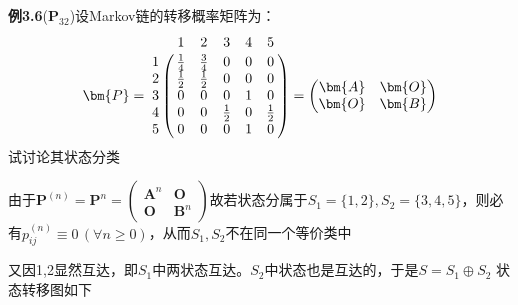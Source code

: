 \documentclass{elegantbook}
\begin{document}
\begin{example}
    \textbf{例3.6}($\mathbf{P}_{32}$)设Markov链的转移概率矩阵为：
    \[\bm{P}=\bordermatrix{
        & 1 & 2 & 3 & 4 & 5 \cr
      1 & \frac{1}{4} & \frac{3}{4} & 0 & 0 & 0 \cr
      2 & \frac{1}{2} & \frac{1}{2} & 0 & 0 & 0 \cr
      3 & 0 & 0 & 0 & 1 & 0 \cr
      4 & 0 & 0 & \frac{1}{2} & 0 & \frac{1}{2} \cr
      5 & 0 & 0 & 0 & 1 & 0}
    =\begin{pmatrix}
      \bm{A} & \bm{O} \\
      \bm{O} & \bm{B} \\
    \end{pmatrix}\]
    试讨论其状态分类
    \begin{solution}
        由于$\bm{P}^{(n)}=\bm{P}^n=\begin{pmatrix}  \bm{A}^n & \bm{O} \\  \bm{O} & \bm{B}^n\end{pmatrix}$故若状态分属于$S_1=\{1,2\},S_2=\{3,4,5\}$，则必有$p_{ij}^{(n)}\equiv 0\,(\forall n\geq 0)$，从而$S_1,S_2$不在同一个等价类中
        \par 又因1,2显然互达，即$S_1$中两状态互达。$S_2$中状态也是互达的，于是$S=S_1 \oplus S_2$
        状态转移图如下
        \begin{center}
\end{center}
\end{solution}
\end{example}
\end{document}
